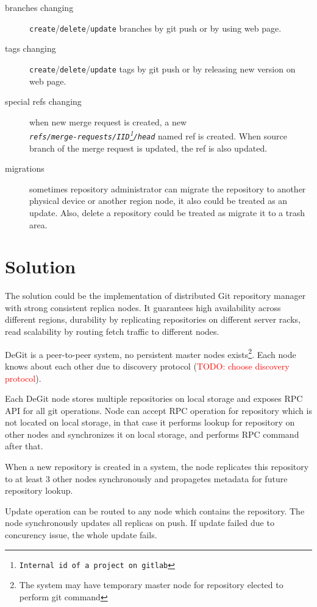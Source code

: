 \documentclass[12pt,oneside]{article}
\newcommand{\code}[1]{\texttt{#1}}
\newcommand{\todo}[1]{\textcolor{red}{TODO: #1}}
\begin{document}
\begin{description}
  \item[branches changing] \verb|create|/\verb|delete|/\verb|update| branches by git push or by using web page.
  \item[tags changing] \verb|create|/\verb|delete|/\verb|update| tags by git push or by releasing new version on web page.
  \item[special refs changing] when new merge request is created, a new\\
    \emph{\code{refs/merge-requests/IID\footnote{Internal id of a project on gitlab}/head}} named ref
    is created. When source branch of the merge request is updated, the ref is also updated.
  \item[migrations] sometimes repository administrator can migrate the repository to
    another physical device or another region node, it also could be treated as an update.
    Also, delete a repository could be treated as migrate it to a trash area.
\end{description}

\section{Solution}

The solution could be the implementation of distributed Git repository manager with
strong consistent replica nodes. It guarantees high availability across
different regions, durability by replicating repositories on different server racks,
read scalability by routing fetch traffic to different nodes.

DeGit is a peer-to-peer system, no persistent master nodes
exists\footnote{The system may have temporary master node for repository elected to perform git command}.
Each node knows about each other due to discovery protocol (\todo{choose discovery protocol}).

Each DeGit node stores multiple repositories on local storage
and exposes RPC API for all git operations. Node can accept RPC operation for repository
which is not located on local storage, in that case it performs lookup
for repository on other nodes and synchronizes it on local storage, and performs RPC command
after that.

When a new repository is created in a system, the node replicates this repository
to at least 3 other nodes synchronously and propagetes metadata for future repository lookup.

Update operation can be routed to any node which contains the repository. The node synchronously
updates all replicas on push. If update failed due to concurency issue, the whole update fails.
\end{document}
